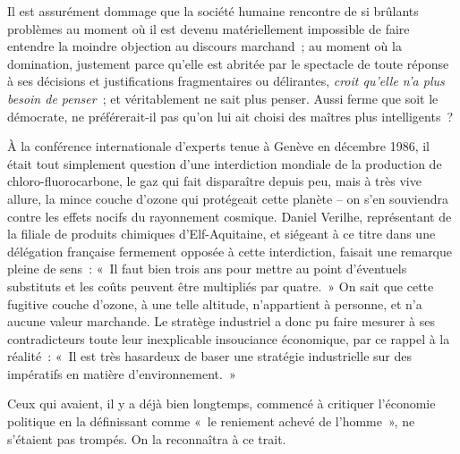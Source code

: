 \documentclass[french,twoside]{book} %
\def\bignobreak{\ifdim\lastskip<\bigskipamount
  \removelastskip\nopagebreak\bigskip\fi}
\newcommand{\labelblock}[1]{\bigbreak{\color{rubric}\noindent\textbf{#1}\par}\bignobreak}
\begin{document}
Il est assurément dommage que la société humaine rencontre de si brûlants problèmes au moment où il est devenu matériellement impossible de faire entendre la moindre objection au discours marchand ; au moment où la domination, justement parce qu’elle est abritée par le spectacle de toute réponse à ses décisions et justifications fragmentaires ou délirantes, \emph{croit qu’elle n’a plus besoin de penser} ; et véritablement ne sait plus penser. Aussi ferme que soit le démocrate, ne préférerait-il pas qu’on lui ait choisi des maîtres plus intelligents ?\par
À la conférence internationale d’experts tenue à Genève en décembre 1986, il était tout simplement question d’une interdiction mondiale de la production de chloro-fluorocarbone, le gaz qui fait disparaître depuis peu, mais à très vive allure, la mince couche d’ozone qui protégeait cette planète – on s’en souviendra contre les effets nocifs du rayonnement cosmique. Daniel Verilhe, représentant de la filiale de produits chimiques d’Elf-Aquitaine, et siégeant à ce titre dans une délégation française fermement opposée à cette interdiction, faisait une remarque pleine de sens : « Il faut bien trois ans pour mettre au point d’éventuels substituts et les coûts peuvent être multipliés par quatre. » On sait que cette fugitive couche d’ozone, à une telle altitude, n’appartient à personne, et n’a aucune valeur marchande. Le stratège industriel a donc pu faire mesurer à ses contradicteurs toute leur inexplicable insouciance économique, par ce rappel à la réalité : « Il est très hasardeux de baser une stratégie industrielle sur des impératifs en matière d’environnement. »\par
Ceux qui avaient, il y a déjà bien longtemps, commencé à critiquer l’économie politique en la définissant comme « le reniement achevé de l’homme », ne s’étaient pas trompés. On la reconnaîtra à ce trait.\par

\labelblock{XIV}
\end{document}
